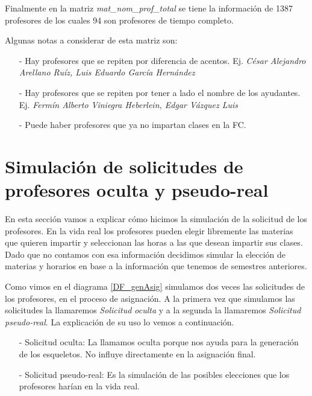 Finalmente en la matriz \textit{mat\_nom\_prof\_total} se tiene la información de 1387 profesores de los cuales 94 son profesores de tiempo completo.

Algunas notas a considerar de esta matriz son:

\begin{itemize}
\item[-] Hay profesores que se repiten por diferencia de acentos. Ej. \textit{César Alejandro Arellano Ruíz, Luis Eduardo García Hernández}

\item[-] Hay profesores que se repiten por tener a lado el nombre de los ayudantes. Ej. \textit{Fermín Alberto Viniegra Heberlein, Edgar Vázquez Luis}

\item[-] Puede haber profesores que ya no impartan clases en la FC.
\end{itemize}


\section{Simulación de solicitudes de profesores oculta y pseudo-real}

En esta sección vamos a explicar cómo hicimos la simulación de la solicitud de los profesores. En la vida real los profesores pueden elegir libremente las materias que quieren impartir y seleccionan las horas a las que desean impartir sus clases. Dado que no contamos con esa información decidimos simular la elección de materias y horarios en base a la información que tenemos de semestres anteriores.

Como vimos en el diagrama \ref{DF_genAsig} simulamos dos veces las solicitudes de los profesores, en el proceso de asignación. A la primera vez que simulamos las solicitudes la llamaremos \textit{Solicitud oculta} y a la segunda la llamaremos \textit{Solicitud pseudo-real}. La explicación de su uso lo vemos a continuación.

\begin{itemize}
\item[-] Solicitud oculta: La llamamos oculta porque nos ayuda para la generación de los esqueletos. No influye directamente en la asignación final.

\item[-] Solicitud pseudo-real: Es la simulación de las posibles elecciones que los profesores harían en la vida real.
\end{itemize}




